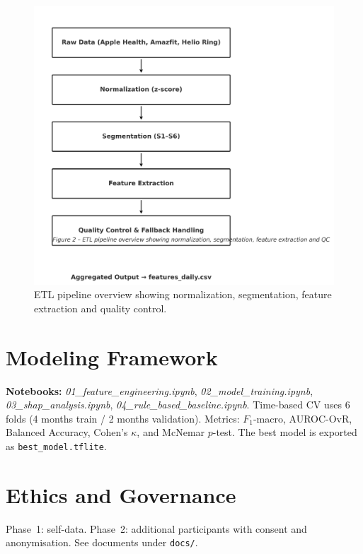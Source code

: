 \documentclass[12pt,a4paper]{article}
\begin{document}
\begin{figure}[H]
  \centering
  \includegraphics[width=0.75\linewidth]{docs/figures/etl-pipeline-paper.png}
  \caption{ETL pipeline overview showing normalization, segmentation, feature extraction and quality control.}
  \label{fig:etl-pipeline}
\end{figure}


\section{Modeling Framework}
\textbf{Notebooks:} \textit{01\_feature\_engineering.ipynb}, \textit{02\_model\_training.ipynb}, \textit{03\_shap\_analysis.ipynb}, \textit{04\_rule\_based\_baseline.ipynb}. Time-based CV uses 6 folds (4 months train / 2 months validation). Metrics: $F_1$-macro, AUROC-OvR, Balanced Accuracy, Cohen's $\kappa$, and McNemar $p$-test. The best model is exported as \texttt{best\_model.tflite}.

\section{Ethics and Governance}
Phase~1: self-data. 
Phase~2: additional participants with consent and anonymisation. See documents under \texttt{docs/}.

\end{document}
